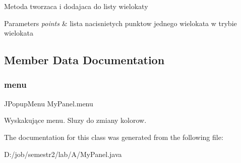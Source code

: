 Metoda tworzaca i dodajaca do listy wielokaty 
\begin{DoxyParams}{Parameters}
{\em points} & lista nacisnietych punktow jednego wielokata w trybie wielokata \\
\hline
\end{DoxyParams}


\subsection{Member Data Documentation}
\mbox{\label{class_my_panel_a5214776606bc8c37c7a8395827a0067b}} 
\subsubsection{\texorpdfstring{menu}{menu}}
{\footnotesize\ttfamily J\+Popup\+Menu My\+Panel.\+menu}

Wyskakujące menu. Sluzy do zmiany kolorow. 

The documentation for this class was generated from the following file\+:\begin{DoxyCompactItemize}
\item 
D\+:/job/semestr2/lab/\+A/My\+Panel.\+java\end{DoxyCompactItemize}
